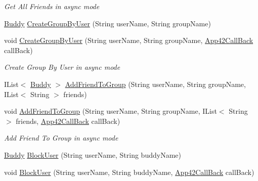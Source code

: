 \begin{DoxyCompactItemize}
\begin{DoxyCompactList}\small\item\em Get All Friends in async mode \end{DoxyCompactList}\item 
\hyperlink{classcom_1_1shephertz_1_1app42_1_1paas_1_1sdk_1_1csharp_1_1buddy_1_1_buddy}{Buddy} \hyperlink{classcom_1_1shephertz_1_1app42_1_1paas_1_1sdk_1_1csharp_1_1buddy_1_1_buddy_service_a69b6c23235623f91fe814074488db480}{Create\+Group\+By\+User} (String user\+Name, String group\+Name)
\item 
void \hyperlink{classcom_1_1shephertz_1_1app42_1_1paas_1_1sdk_1_1csharp_1_1buddy_1_1_buddy_service_a04e4f9e3063a27d2cde5bd898d2b9624}{Create\+Group\+By\+User} (String user\+Name, String group\+Name, \hyperlink{interfacecom_1_1shephertz_1_1app42_1_1paas_1_1sdk_1_1csharp_1_1_app42_call_back}{App42\+Call\+Back} call\+Back)
\begin{DoxyCompactList}\small\item\em Create Group By User in async mode \end{DoxyCompactList}\item 
I\+List$<$ \hyperlink{classcom_1_1shephertz_1_1app42_1_1paas_1_1sdk_1_1csharp_1_1buddy_1_1_buddy}{Buddy} $>$ \hyperlink{classcom_1_1shephertz_1_1app42_1_1paas_1_1sdk_1_1csharp_1_1buddy_1_1_buddy_service_abbe05303995b5d6d158282936f8a2fb7}{Add\+Friend\+To\+Group} (String user\+Name, String group\+Name, I\+List$<$ String $>$ friends)
\item 
void \hyperlink{classcom_1_1shephertz_1_1app42_1_1paas_1_1sdk_1_1csharp_1_1buddy_1_1_buddy_service_a7cc281ef7f208f8b6a774d58f34ea7e5}{Add\+Friend\+To\+Group} (String user\+Name, String group\+Name, I\+List$<$ String $>$ friends, \hyperlink{interfacecom_1_1shephertz_1_1app42_1_1paas_1_1sdk_1_1csharp_1_1_app42_call_back}{App42\+Call\+Back} call\+Back)
\begin{DoxyCompactList}\small\item\em Add Friend To Group in async mode \end{DoxyCompactList}\item 
\hyperlink{classcom_1_1shephertz_1_1app42_1_1paas_1_1sdk_1_1csharp_1_1buddy_1_1_buddy}{Buddy} \hyperlink{classcom_1_1shephertz_1_1app42_1_1paas_1_1sdk_1_1csharp_1_1buddy_1_1_buddy_service_a0f71a394f985702f0965831345059b30}{Block\+User} (String user\+Name, String buddy\+Name)
\item 
void \hyperlink{classcom_1_1shephertz_1_1app42_1_1paas_1_1sdk_1_1csharp_1_1buddy_1_1_buddy_service_ac32bdbae3fa9a63c7e9fb9a1a0a04179}{Block\+User} (String user\+Name, String buddy\+Name, \hyperlink{interfacecom_1_1shephertz_1_1app42_1_1paas_1_1sdk_1_1csharp_1_1_app42_call_back}{App42\+Call\+Back} call\+Back)

\end{DoxyCompactItemize}
